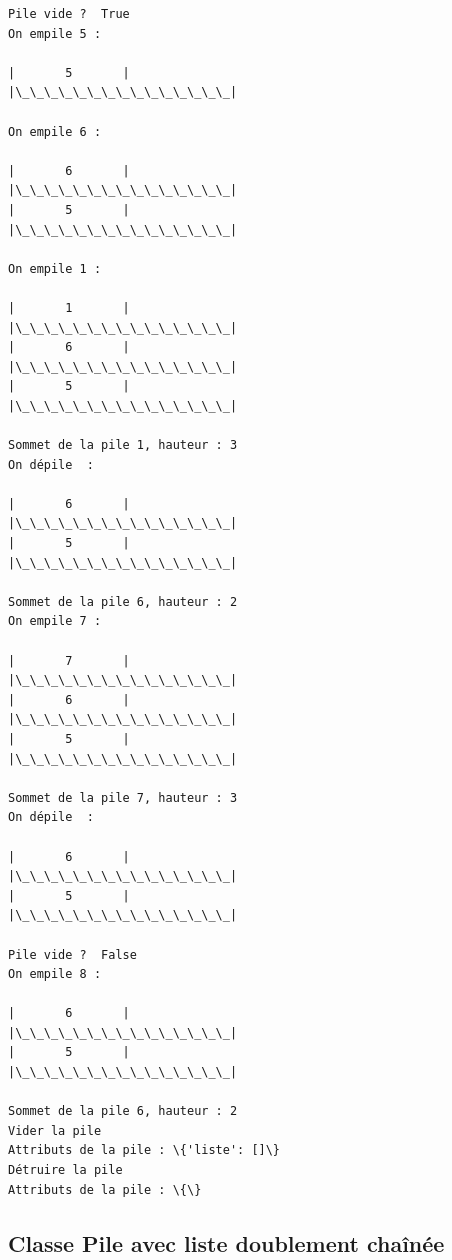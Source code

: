 \documentclass[11pt]{article}
\begin{document}
    \begin{Verbatim}[commandchars=\\\{\}]
Pile vide ?  True
On empile 5 : 

|       5       |
|\_\_\_\_\_\_\_\_\_\_\_\_\_\_\_|

On empile 6 : 

|       6       |
|\_\_\_\_\_\_\_\_\_\_\_\_\_\_\_|
|       5       |
|\_\_\_\_\_\_\_\_\_\_\_\_\_\_\_|

On empile 1 : 

|       1       |
|\_\_\_\_\_\_\_\_\_\_\_\_\_\_\_|
|       6       |
|\_\_\_\_\_\_\_\_\_\_\_\_\_\_\_|
|       5       |
|\_\_\_\_\_\_\_\_\_\_\_\_\_\_\_|

Sommet de la pile 1, hauteur : 3
On dépile  : 

|       6       |
|\_\_\_\_\_\_\_\_\_\_\_\_\_\_\_|
|       5       |
|\_\_\_\_\_\_\_\_\_\_\_\_\_\_\_|

Sommet de la pile 6, hauteur : 2
On empile 7 : 

|       7       |
|\_\_\_\_\_\_\_\_\_\_\_\_\_\_\_|
|       6       |
|\_\_\_\_\_\_\_\_\_\_\_\_\_\_\_|
|       5       |
|\_\_\_\_\_\_\_\_\_\_\_\_\_\_\_|

Sommet de la pile 7, hauteur : 3
On dépile  : 

|       6       |
|\_\_\_\_\_\_\_\_\_\_\_\_\_\_\_|
|       5       |
|\_\_\_\_\_\_\_\_\_\_\_\_\_\_\_|

Pile vide ?  False
On empile 8 : 

|       6       |
|\_\_\_\_\_\_\_\_\_\_\_\_\_\_\_|
|       5       |
|\_\_\_\_\_\_\_\_\_\_\_\_\_\_\_|

Sommet de la pile 6, hauteur : 2
Vider la pile
Attributs de la pile : \{'liste': []\}
Détruire la pile
Attributs de la pile : \{\}

    \end{Verbatim}

    \hypertarget{classe-pile-avec-liste-doublement-chauxeenuxe9e}{%
\subsection{Classe Pile avec liste doublement
chaînée}\label{classe-pile-avec-liste-doublement-chauxeenuxe9e}}
\end{document}
